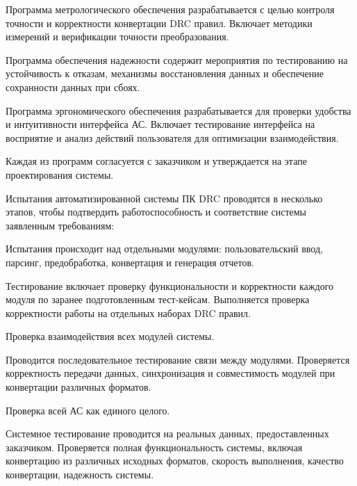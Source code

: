 Программа метрологического обеспечения
разрабатывается с целью контроля точности
и корректности конвертации DRC правил.
Включает методики измерений и верификации точности преобразования.
  
Программа обеспечения надежности содержит мероприятия
по тестированию на устойчивость к отказам,
механизмы восстановления данных и обеспечение сохранности данных при сбоях.

Программа эргономического обеспечения разрабатывается
для проверки удобства и интуитивности интерфейса АС.
Включает тестирование интерфейса на восприятие
и анализ действий пользователя для оптимизации взаимодействия.

Каждая из программ согласуется с заказчиком
и утверждается на этапе проектирования системы.



Испытания автоматизированной системы ПК DRC проводятся в несколько этапов,
чтобы подтвердить работоспособность
и соответствие системы заявленным требованиям:


Испытания происходит над отдельными модулями:
пользовательский ввод, парсинг, предобработка,
конвертация и генерация отчетов.

Тестирование включает проверку функциональности
и корректности каждого модуля по заранее подготовленным тест-кейсам.
Выполняется проверка корректности работы на отдельных наборах DRC правил.
  

Проверка взаимодействия всех модулей системы.

Проводится последовательное тестирование связи между модулями.
Проверяется корректность передачи данных, синхронизация
и совместимость модулей при конвертации различных форматов.


Проверка всей АС как единого целого.

Системное тестирование проводится на реальных данных,
предоставленных заказчиком.
Проверяется полная функциональность системы,
включая конвертацию из различных исходных форматов,
скорость выполнения, качество конвертации, надежность системы.


